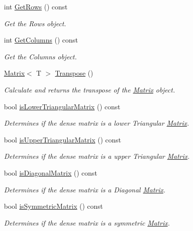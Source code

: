 \begin{DoxyCompactItemize}
int \mbox{\hyperlink{class_matrix_aa665db4bc173a7bb4ec3f9da2676dfa6}{Get\+Rows}} () const
\begin{DoxyCompactList}\small\item\em Get the Rows object. \end{DoxyCompactList}\item 
int \mbox{\hyperlink{class_matrix_ada60917bb197292e0645992e108c2c2f}{Get\+Columns}} () const
\begin{DoxyCompactList}\small\item\em Get the Columns object. \end{DoxyCompactList}\item 
\mbox{\hyperlink{class_matrix}{Matrix}}$<$ T $>$ \mbox{\hyperlink{class_matrix_a86d55a5db43b641f4e8fb2b302ccc599}{Transpose}} ()
\begin{DoxyCompactList}\small\item\em Calculate and returns the transpose of the \mbox{\hyperlink{class_matrix}{Matrix}} object. \end{DoxyCompactList}\item 
bool \mbox{\hyperlink{class_matrix_a6e1df160cc8cb63f5b0bb58398b6e7ca}{is\+Lower\+Triangular\+Matrix}} () const
\begin{DoxyCompactList}\small\item\em Determines if the dense matrix is a lower Triangular \mbox{\hyperlink{class_matrix}{Matrix}}. \end{DoxyCompactList}\item 
bool \mbox{\hyperlink{class_matrix_a3d177e2d4c6d8ccf7a1c4c651f4bc075}{is\+Upper\+Triangular\+Matrix}} () const
\begin{DoxyCompactList}\small\item\em Determines if the dense matrix is a upper Triangular \mbox{\hyperlink{class_matrix}{Matrix}}. \end{DoxyCompactList}\item 
bool \mbox{\hyperlink{class_matrix_a899d992e9151c92ad301afc6699ba9c4}{is\+Diagonal\+Matrix}} () const
\begin{DoxyCompactList}\small\item\em Determines if the dense matrix is a Diagonal \mbox{\hyperlink{class_matrix}{Matrix}}. \end{DoxyCompactList}\item 
bool \mbox{\hyperlink{class_matrix_a4ce91f41c6396308570f5ba88f0f6b17}{is\+Symmetric\+Matrix}} () const
\begin{DoxyCompactList}\small\item\em Determines if the dense matrix is a symmetric \mbox{\hyperlink{class_matrix}{Matrix}}. \end{DoxyCompactList}\item 

\end{DoxyCompactItemize}
